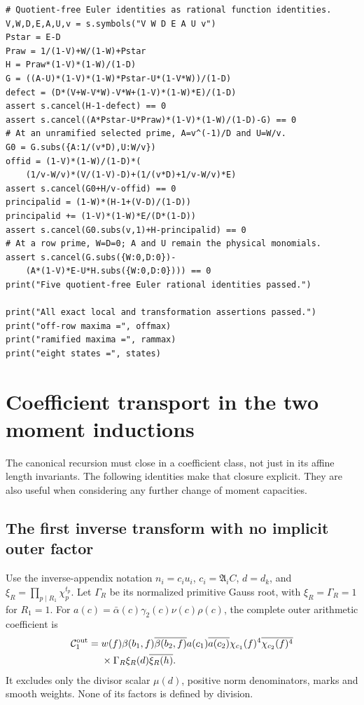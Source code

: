 \documentclass[12pt]{article}
\begin{document}
\begin{verbatim}
# Quotient-free Euler identities as rational function identities.
V,W,D,E,A,U,v = s.symbols("V W D E A U v")
Pstar = E-D
Praw = 1/(1-V)+W/(1-W)+Pstar
H = Praw*(1-V)*(1-W)/(1-D)
G = ((A-U)*(1-V)*(1-W)*Pstar-U*(1-V*W))/(1-D)
defect = (D*(V+W-V*W)-V*W+(1-V)*(1-W)*E)/(1-D)
assert s.cancel(H-1-defect) == 0
assert s.cancel((A*Pstar-U*Praw)*(1-V)*(1-W)/(1-D)-G) == 0
# At an unramified selected prime, A=v^(-1)/D and U=W/v.
G0 = G.subs({A:1/(v*D),U:W/v})
offid = (1-V)*(1-W)/(1-D)*(
    (1/v-W/v)*(V/(1-V)-D)+(1/(v*D)+1/v-W/v)*E)
assert s.cancel(G0+H/v-offid) == 0
principalid = (1-W)*(H-1+(V-D)/(1-D))
principalid += (1-V)*(1-W)*E/(D*(1-D))
assert s.cancel(G0.subs(v,1)+H-principalid) == 0
# At a row prime, W=D=0; A and U remain the physical monomials.
assert s.cancel(G.subs({W:0,D:0})-
    (A*(1-V)*E-U*H.subs({W:0,D:0}))) == 0
print("Five quotient-free Euler rational identities passed.")

print("All exact local and transformation assertions passed.")
print("off-row maxima =", offmax)
print("ramified maxima =", rammax)
print("eight states =", states)
\end{verbatim}



\section{Coefficient transport in the two moment inductions}
The canonical recursion must close in a coefficient class, not just in
its affine length invariants.  The following identities make that
closure explicit.  They are also useful when considering any further
change of moment capacities.

\subsection{The first inverse transform with no implicit outer factor}
Use the inverse-appendix notation \(n_i=c_i u_i\),
\(c_i=\mathfrak A_iC\), \(d=d_k\), and
\(\xi_R=\prod_{p\mid R_1}\chi_p^{t_p}\).
Let \(\Gamma_R\) be its normalized primitive Gauss root, with
\(\xi_R=\Gamma_R=1\) for \(R_1=1\).  For
\(a(c)=\bar\alpha(c)\gamma_2(c)\nu(c)\rho(c)\), the complete
outer arithmetic coefficient is
\[
\begin{split}
 {\cal C}^{\rm out}_1={}&w(f)\beta(b_1,f)\overline{\beta(b_2,f)}
      a(c_1)\overline{a(c_2)}
      \chi_{c_1}(f)^4\overline{\chi_{c_2}(f)^4}\\
 &\times\Gamma_R\xi_R(d)\overline{\xi_R(h)} .
\end{split}
\]
It excludes only the divisor scalar \(\mu(d)\), positive norm
denominators, marks and smooth weights.  None of its factors is
defined by division.
\end{document}
